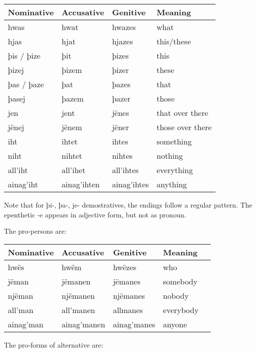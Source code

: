 \begin{center}
\begin{tabular}{llll}
Nominative & Accusative & Genitive & Meaning \\
\hline
hwas       & hwat  & hwazes  & what  \\
hjas       & hjat  & hjazes  & this/these  \\
þis / þize & þit   & þizes   & this  \\
þizej      & þizem & þizer   & these \\
þas / þaze & þat   & þazes   & that  \\
þasej      & þazem & þazer   & those \\
jen        & jent  & jënes   & that over there \\
jënej      & jënem & jëner   & those over there \\
\hline
iht       & ihtet       & ihtes       & something \\
niht      & nihtet      & nihtes      & nothing \\
all'iht   & all'ihet    & all'ihtes   & everything \\
ainag'iht & ainag'ihten & ainag'ihtes & anything \\
\end{tabular}
\end{center}

Note that for þi-, þa-, je- demostratives, the endings follow a regular pattern. The epenthetic -e appears in adjective form, but not as pronoun.

The pro-persons are:

\begin{center}
\begin{tabular}{lllll}
Nominative & Accusative & Genitive & Meaning \\
\hline
hwës      & hwëm           & hwëzes       & who       \\
jëman     & jëmanen        & jëmanes      & somebody  \\
njëman    & njëmanen       & njëmanes     & nobody    \\
all'man   & all'manen      & allmanes     & everybody \\
ainag'man & ainag'manen    & ainag'manes  & anyone    \\
\end{tabular}
\end{center}

The pro-forms of alternative are:

